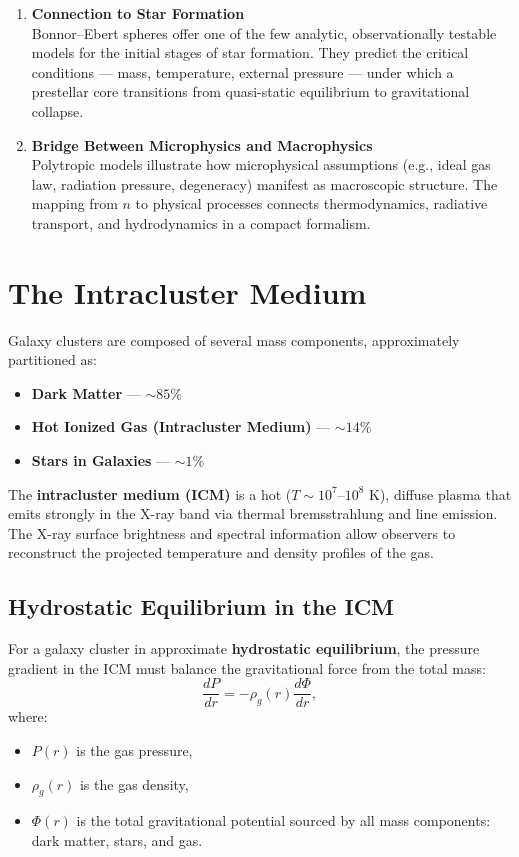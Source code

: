 \begin{enumerate}
    \item \textbf{Connection to Star Formation} \\
    Bonnor–Ebert spheres offer one of the few analytic, observationally testable models for the initial stages of star formation. They predict the critical conditions — mass, temperature, external pressure — under which a prestellar core transitions from quasi-static equilibrium to gravitational collapse.

    \item \textbf{Bridge Between Microphysics and Macrophysics} \\
    Polytropic models illustrate how microphysical assumptions (e.g., ideal gas law, radiation pressure, degeneracy) manifest as macroscopic structure. The mapping from $n$ to physical processes connects thermodynamics, radiative transport, and hydrodynamics in a compact formalism.

\end{enumerate}

\section{The Intracluster Medium}

Galaxy clusters are composed of several mass components, approximately partitioned as:
\begin{itemize}
    \item \textbf{Dark Matter} — $\sim 85\%$
    \item \textbf{Hot Ionized Gas (Intracluster Medium)} — $\sim 14\%$
    \item \textbf{Stars in Galaxies} — $\sim 1\%$
\end{itemize}

The \textbf{intracluster medium (ICM)} is a hot ($T \sim 10^7$–$10^8$ K), diffuse plasma that emits strongly in the X-ray band via thermal bremsstrahlung and line emission. The X-ray surface brightness and spectral information allow observers to reconstruct the projected temperature and density profiles of the gas.

\subsection{Hydrostatic Equilibrium in the ICM}

For a galaxy cluster in approximate \textbf{hydrostatic equilibrium}, the pressure gradient in the ICM must balance the gravitational force from the total mass:
\[
\frac{dP}{dr} = -\rho_g(r) \frac{d\Phi}{dr},
\]
where:
\begin{itemize}
    \item $P(r)$ is the gas pressure,
    \item $\rho_g(r)$ is the gas density,
    \item $\Phi(r)$ is the total gravitational potential sourced by all mass components: dark matter, stars, and gas.
\end{itemize}

